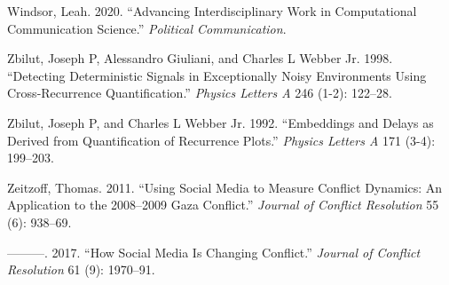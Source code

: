\documentclass[
  english,
  man]{apa6}
\begin{document}
\leavevmode\hypertarget{ref-Windsor2020}{}%
Windsor, Leah. 2020. ``Advancing Interdisciplinary Work in Computational Communication Science.'' \emph{Political Communication}.

\leavevmode\hypertarget{ref-zbilut1998detecting}{}%
Zbilut, Joseph P, Alessandro Giuliani, and Charles L Webber Jr. 1998. ``Detecting Deterministic Signals in Exceptionally Noisy Environments Using Cross-Recurrence Quantification.'' \emph{Physics Letters A} 246 (1-2): 122--28.

\leavevmode\hypertarget{ref-zbilut1992embeddings}{}%
Zbilut, Joseph P, and Charles L Webber Jr. 1992. ``Embeddings and Delays as Derived from Quantification of Recurrence Plots.'' \emph{Physics Letters A} 171 (3-4): 199--203.

\leavevmode\hypertarget{ref-zeitzoff2011using}{}%
Zeitzoff, Thomas. 2011. ``Using Social Media to Measure Conflict Dynamics: An Application to the 2008--2009 Gaza Conflict.'' \emph{Journal of Conflict Resolution} 55 (6): 938--69.

\leavevmode\hypertarget{ref-zeitzoff2017social}{}%
---------. 2017. ``How Social Media Is Changing Conflict.'' \emph{Journal of Conflict Resolution} 61 (9): 1970--91.

\endgroup
\end{document}
